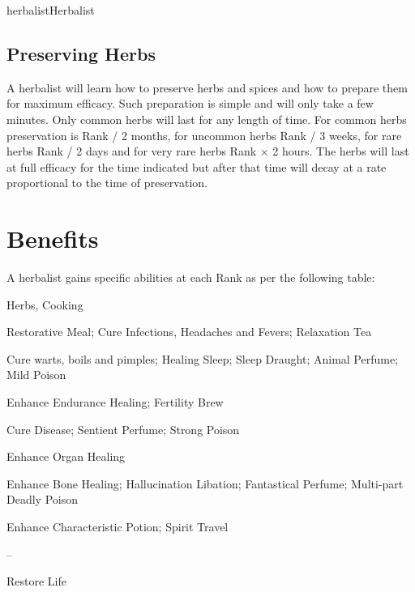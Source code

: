 \begin{Skill}[1.1]{herbalist}{Herbalist}
\subsection{Preserving Herbs}

A herbalist will learn how to preserve herbs and spices and how to
prepare them for maximum efficacy.  Such preparation is simple and
will only take a few minutes.  Only common herbs will last for any
length of time.  For common herbs preservation is Rank / 2 months, for
uncommon herbs Rank / 3 weeks, for rare herbs Rank / 2 days and for
very rare herbs Rank × 2 hours.  The herbs will last at full efficacy
for the time indicated but after that time will decay at a rate
proportional to the time of preservation.

\section{Benefits}

A herbalist gains specific abilities at each Rank as per the following
table:

\begin{Enumerate}\setcounter{enumi}{-1}
\item Herbs, Cooking

\item Restorative Meal; Cure Infections, Headaches and Fevers;
  Relaxation Tea

\item Cure warts, boils and pimples; Healing Sleep; Sleep Draught;
  Animal Perfume; Mild Poison

\item Enhance Endurance Healing; Fertility Brew

\item Cure Disease;
  Sentient Perfume; Strong Poison 

\item Enhance Organ Healing

\item Enhance Bone Healing; Hallucination Libation; Fantastical
  Perfume; Multi-part Deadly Poison

\item Enhance Characteristic Potion; Spirit Travel

\item – 

\item Restore Life

\end{Enumerate}


\end{Skill}
